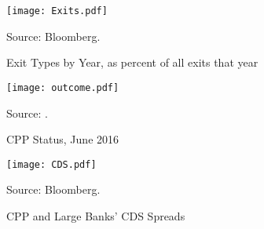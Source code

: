 \documentclass[12pt]{article}
\begin{document}
\begin{figure}[h]
\caption{Exit Types by Year, as percent of all exits that year}\label{exits}
\centering
\texttt{[image: Exits.pdf]}
\raggedright
\footnotesize Source: Bloomberg.
\end{figure}

\begin{figure}[h]
\caption{CPP Status, June 2016}\label{outcome}
\centering
\texttt{[image: outcome.pdf]}
\raggedright
\footnotesize Source: \citet{GAO}.
\end{figure}


\begin{figure}[h]
\caption{CPP and Large Banks' CDS Spreads}\label{CDS}
\centering
\texttt{[image: CDS.pdf]}
\raggedright
\footnotesize Source: Bloomberg.
\end{figure}
\end{document}
